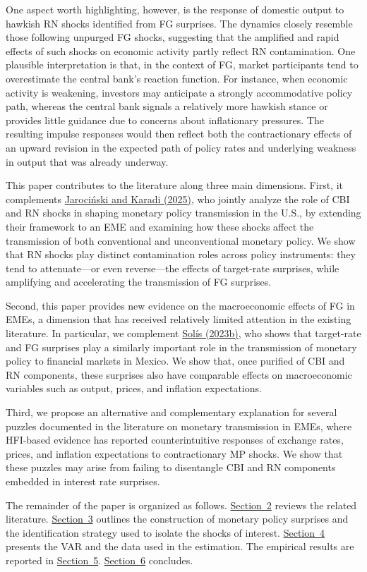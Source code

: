 \documentclass[\latexroot/\projectname]{subfiles}
\begin{document}
One aspect worth highlighting, however, is the response of domestic output to hawkish RN shocks identified from FG surprises. The dynamics closely resemble those following unpurged FG shocks, suggesting that the amplified and rapid effects of such shocks on economic activity partly reflect RN contamination. One plausible interpretation is that, in the context of FG, market participants tend to overestimate the central bank's reaction function. For instance, when economic activity is weakening, investors may anticipate a strongly accommodative policy path, whereas the central bank signals a relatively more hawkish stance or provides little guidance due to concerns about inflationary pressures. The resulting impulse responses would then reflect both the contractionary effects of an upward revision in the expected path of policy rates and underlying weakness in output that was already underway.

This paper contributes to the literature along three main dimensions. First, it complements \hyperlink{Jarociński and Karadi (2025)}{Jarociński and Karadi (2025)}, who jointly analyze the role of CBI and RN shocks in shaping monetary policy transmission in the U.S., by extending their framework to an EME and examining how these shocks affect the transmission of both conventional and unconventional monetary policy. We show that RN shocks play distinct contamination roles across policy instruments: they tend to attenuate—or even reverse—the effects of target-rate surprises, while amplifying and accelerating the transmission of FG surprises. 

Second, this paper provides new evidence on the macroeconomic effects of FG in EMEs, a dimension that has received relatively limited attention in the existing literature. In particular, we complement \hyperlink{Solis (2023b)}{Solís (2023b)}, who shows that target-rate and FG surprises play a similarly important role in the transmission of monetary policy to financial markets in Mexico. We show that, once purified of CBI and RN components, these surprises also have comparable effects on macroeconomic variables such as output, prices, and inflation expectations. 

Third, we propose an alternative and complementary explanation for several puzzles documented in the literature on monetary transmission in EMEs, where HFI-based evidence has reported counterintuitive responses of exchange rates, prices, and inflation expectations to contractionary MP shocks. We show that these puzzles may arise from failing to disentangle CBI and RN components embedded in interest rate surprises.

The remainder of the paper is organized as follows. \hyperlink{Section 2}{Section~2} reviews the related literature. \hyperlink{Section 3}{Section~3} outlines the construction of monetary policy surprises and the identification strategy used to isolate the shocks of interest. \hyperlink{Section 4}{Section~4} presents the VAR and the data used in the estimation. The empirical results are reported in \hyperlink{Section 5}{Section~5}. \hyperlink{Section 6}{Section~6} concludes.

\smartbib
\end{document}
